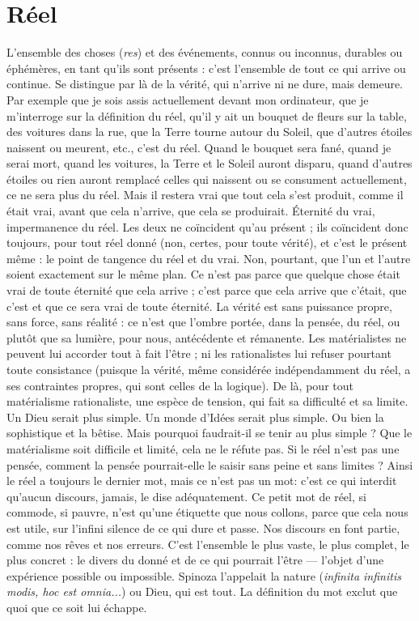 \section{Réel}
L'ensemble des choses ({\it res}) et des événements, connus ou inconnus,
durables ou éphémères, en tant qu’ils sont présents : c’est l’ensemble
de tout ce qui arrive ou continue. Se distingue par là de la vérité, qui n’arrive ni
ne dure, mais demeure. Par exemple que je sois assis actuellement devant mon
ordinateur, que je m’interroge sur la définition du réel, qu’il y ait un bouquet de
fleurs sur la table, des voitures dans la rue, que la Terre tourne autour du Soleil,
que d’autres étoiles naissent ou meurent, etc., c'est du réel. Quand le bouquet
sera fané, quand je serai mort, quand les voitures, la Terre et le Soleil auront disparu,
quand d’autres étoiles ou rien auront remplacé celles qui naissent ou se consument
actuellement, ce ne sera plus du réel. Mais il restera vrai que tout cela s’est
produit, comme il était vrai, avant que cela n'arrive, que cela se produirait. Éternité
du vrai, impermanence du réel. Les deux ne coïncident qu’au présent ; ils
coïncident donc toujours, pour tout réel donné (non, certes, pour toute vérité),
et c’est le présent même : le point de tangence du réel et du vrai. Non, pourtant,
que l’un et l’autre soient exactement sur le même plan. Ce n’est pas parce que
quelque chose était vrai de toute éternité que cela arrive ; c’est parce que cela
arrive que c'était, que c’est et que ce sera vrai de toute éternité. La vérité est sans
puissance propre, sans force, sans réalité : ce n’est que l’ombre portée, dans la
pensée, du réel, ou plutôt que sa lumière, pour nous, antécédente et rémanente.
Les matérialistes ne peuvent lui accorder tout à fait l’être ; ni les rationalistes lui
refuser pourtant toute consistance (puisque la vérité, même considérée indépendamment
du réel, a ses contraintes propres, qui sont celles de la logique). De là,
pour tout matérialisme rationaliste, une espèce de tension, qui fait sa difficulté et
sa limite. Un Dieu serait plus simple. Un monde d’Idées serait plus simple. Ou
bien la sophistique et la bêtise. Mais pourquoi faudrait-il se tenir au plus simple ?
Que le matérialisme soit difficile et limité, cela ne le réfute pas. Si le réel n’est pas
une pensée, comment la pensée pourrait-elle le saisir sans peine et sans limites ?
Ainsi le réel a toujours le dernier mot, mais ce n’est pas un mot: c’est ce qui
interdit qu'aucun discours, jamais, le dise adéquatement. Ce petit mot de réel, si
commode, si pauvre, n’est qu’une étiquette que nous collons, parce que cela nous
est utile, sur l'infini silence de ce qui dure et passe. Nos discours en font partie,
comme nos rêves et nos erreurs. C’est l’ensemble le plus vaste, le plus complet, le
plus concret : le divers du donné et de ce qui pourrait l’être — l’objet d’une expérience
possible ou impossible. Spinoza l’appelait la nature ({\it infinita infinitis modis,
hoc est omnia...}) ou Dieu, qui est tout. La définition du mot exclut que quoi que
ce soit lui échappe.


